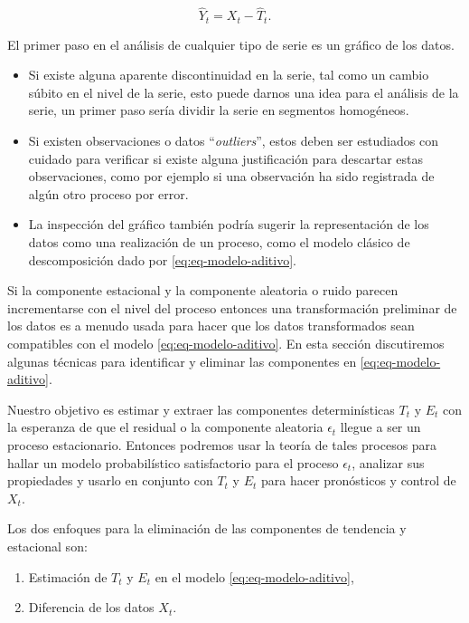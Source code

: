 \documentclass[12pt,]{krantz}
\providecommand{\tightlist}{%
  \setlength{\itemsep}{0pt}\setlength{\parskip}{0pt}}
\theoremstyle{definition}
\theoremstyle{definition}
\theoremstyle{definition}
\theoremstyle{remark}
\begin{document}
\begin{equation}
\hat{Y}_t=X_t-\hat{T}_t.
\label{eq:eq-estimacion-componente-tendencia}
\end{equation}

El primer paso en el análisis de cualquier tipo de serie es un gráfico
de los datos.

\begin{itemize}
\item
  Si existe alguna aparente discontinuidad en la serie, tal como un
  cambio súbito en el nivel de la serie, esto puede darnos una idea para
  el análisis de la serie, un primer paso sería dividir la serie en
  segmentos homogéneos.
\item
  Si existen observaciones o datos ``\emph{outliers}'', estos deben ser
  estudiados con cuidado para verificar si existe alguna justificación
  para descartar estas observaciones, como por ejemplo si una
  observación ha sido registrada de algún otro proceso por error.
\item
  La inspección del gráfico también podría sugerir la representación de
  los datos como una realización de un proceso, como el modelo clásico
  de descomposición dado por \eqref{eq:eq-modelo-aditivo}.
\end{itemize}

Si la componente estacional y la componente aleatoria o ruido parecen
incrementarse con el nivel del proceso entonces una transformación
preliminar de los datos es a menudo usada para hacer que los datos
transformados sean compatibles con el modelo \eqref{eq:eq-modelo-aditivo}.
En esta sección discutiremos algunas técnicas para identificar y
eliminar las componentes en \eqref{eq:eq-modelo-aditivo}.

Nuestro objetivo es estimar y extraer las componentes determinísticas
\(T_t\) y \(E_t\) con la esperanza de que el residual o la componente
aleatoria \(\epsilon_t\) llegue a ser un proceso estacionario. Entonces
podremos usar la teoría de tales procesos para hallar un modelo
probabilístico satisfactorio para el proceso \(\epsilon_t\), analizar
sus propiedades y usarlo en conjunto con \(T_t\) y \(E_t\) para hacer
pronósticos y control de \(X_t\).

Los dos enfoques para la eliminación de las componentes de tendencia y
estacional son:

\begin{enumerate}
\def\labelenumi{\arabic{enumi}.}
\tightlist
\item
  Estimación de \(T_t\) y \(E_t\) en el modelo
  \eqref{eq:eq-modelo-aditivo},
\item
  Diferencia de los datos \(X_t\).
\end{enumerate}
\end{document}
